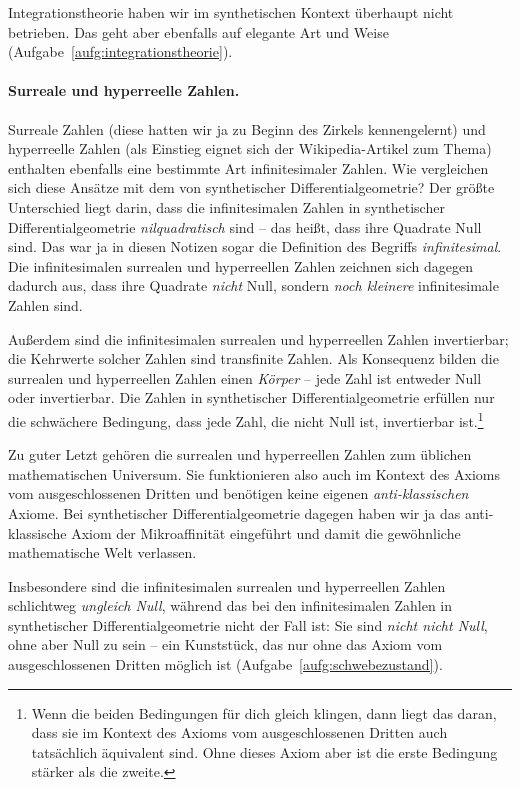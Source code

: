 \documentclass[twoside]{../zirkelblatt}
\theoremstyle{definition}
\theoremstyle{plain}
\theoremstyle{remark}
\begin{document}
Integrationstheorie haben wir im synthetischen Kontext überhaupt nicht
betrieben. Das geht aber ebenfalls auf elegante Art und Weise
(Aufgabe~\ref{aufg:integrationstheorie}).


\paragraph{Surreale und hyperreelle Zahlen.}
Surreale Zahlen (diese hatten wir ja zu Beginn des Zirkels kennengelernt)
und hyperreelle Zahlen (als Einstieg eignet sich der Wikipedia-Artikel zum
Thema) enthalten ebenfalls eine bestimmte Art infinitesimaler Zahlen. Wie
vergleichen sich diese Ansätze mit dem von synthetischer Differentialgeometrie?
Der größte Unterschied liegt darin, dass die infinitesimalen Zahlen in
synthetischer Differentialgeometrie \emph{nilquadratisch} sind -- das heißt,
dass ihre Quadrate Null sind. Das war ja in diesen Notizen sogar die Definition des
Begriffs \emph{infinitesimal}. Die infinitesimalen surrealen und hyperreellen
Zahlen zeichnen sich dagegen dadurch aus, dass ihre Quadrate \emph{nicht} Null, sondern
\emph{noch kleinere} infinitesimale Zahlen sind.

Außerdem sind die infinitesimalen surrealen und hyperreellen Zahlen
invertierbar; die Kehrwerte solcher Zahlen sind transfinite Zahlen. Als
Konsequenz bilden die surrealen und hyperreellen Zahlen einen \emph{Körper} -- jede Zahl ist
entweder Null oder invertierbar. Die Zahlen in synthetischer
Differentialgeometrie erfüllen nur die schwächere Bedingung, dass jede Zahl, die
nicht Null ist, invertierbar ist.\footnote{Wenn die beiden Bedingungen für dich
gleich klingen, dann liegt das daran, dass sie im Kontext des Axioms vom
ausgeschlossenen Dritten auch tatsächlich äquivalent sind. Ohne dieses Axiom
aber ist die erste Bedingung stärker als die zweite.}

Zu guter Letzt gehören die surrealen und hyperreellen Zahlen zum üblichen
mathematischen Universum. Sie funktionieren also auch im Kontext des Axioms vom
ausgeschlossenen Dritten und benötigen keine eigenen \emph{anti-klassischen}
Axiome. Bei synthetischer Differentialgeometrie dagegen haben wir ja das
anti-klassische Axiom der Mikroaffinität eingeführt und damit die gewöhnliche
mathematische Welt verlassen.

Insbesondere sind die infinitesimalen surrealen
und hyperreellen Zahlen schlichtweg \emph{ungleich Null}, während das bei den
infinitesimalen Zahlen in synthetischer Differentialgeometrie nicht der Fall
ist: Sie sind \emph{nicht nicht Null}, ohne aber Null zu sein -- ein
Kunststück, das nur ohne das Axiom vom ausgeschlossenen Dritten möglich ist
(Aufgabe~\ref{aufg:schwebezustand}).
\end{document}
